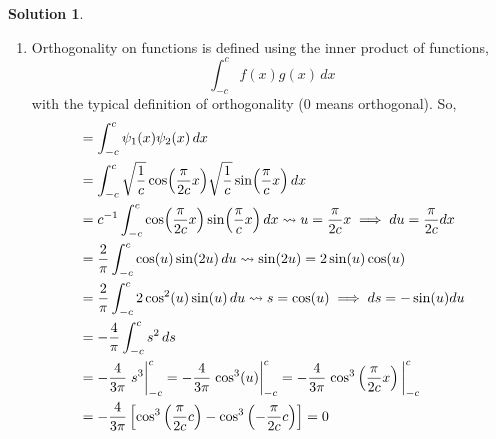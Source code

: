 \documentclass[10pt]{article}
\theoremstyle{definition}
\newtheorem{soln}{Solution}
\begin{document}
\begin{soln}
\begin{enumerate}[label=(\alph*)]
\begin{enumerate}[label=(\roman*)]
                  solution as we would expect.
            \item Orthogonality on functions is defined using the inner product of functions,
                  $$\int_{-c}^c f(x)g(x)\,dx$$
                  with the typical definition of orthogonality (0 means orthogonal). So,
                  \begin{align*}
                     & =\int_{-c}^c\psi_1(x)\psi_2(x)\,dx \\
                     & =\int_{-c}^c\sqrt{\frac{1}{c}}\cos(\frac{\pi}{2c}x)\sqrt{\frac{1}{c}}\sin(\frac{\pi}{c}x)\,dx \\
                     & =c^{-1}\int_{-c}^c\cos(\frac{\pi}{2c}x)\sin(\frac{\pi}{c}x)\,dx\rightsquigarrow u=\frac{\pi}{2c}x\implies du=\frac{\pi}{2c}dx\\
                     & =\frac{2}{\pi}\int_{-c}^c\cos(u)\sin(2u)\,du\rightsquigarrow \sin(2u)=2\sin (u)\cos (u)\\
                     & =\frac{2}{\pi}\int_{-c}^c2\cos^2(u)\sin(u)\,du\rightsquigarrow s=\cos(u)\implies ds=-\sin(u)du\\
                     & =-\frac{4}{\pi}\int_{-c}^cs^2\,ds\\
                     & =-\frac{4}{3\pi}\eval{s^3}_{-c}^{c}=-\frac{4}{3\pi}\eval{\cos^3(u)}_{-c}^{c}=-\frac{4}{3\pi}\eval{\cos^3\left(\frac{\pi}{2c}x\right)}_{-c}^{c}\\
                     & =-\frac{4}{3\pi}\left[\cos^3\left(\frac{\pi}{2c}c\right)-\cos^3\left(-\frac{\pi}{2c}c\right)\right]=0\\
                  \end{align*}
          \end{enumerate}
  \end{enumerate}
\end{soln}
\end{document}
